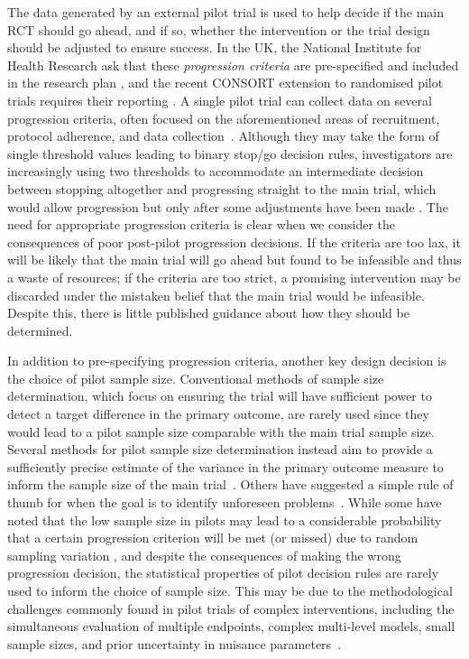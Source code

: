 \documentclass[AMA,STIX1COL]{WileyNJD-v2}
\begin{document}
The data generated by an external pilot trial is used to help decide if the main RCT should go ahead, and if so, whether the intervention or the trial design should be adjusted to ensure success. In the UK, the National Institute for Health Research ask that these \emph{progression criteria} are pre-specified and included in the research plan \cite{NIHR2017}, and the recent CONSORT extension to randomised pilot trials requires their reporting \cite{Eldridge2016a}. A single pilot trial can collect data on several progression criteria, often focused on the aforementioned areas of recruitment, protocol adherence, and data collection~\cite{Avery2017}. Although they may take the form of single threshold values leading to binary stop/go decision rules, investigators are increasingly using two thresholds to accommodate an intermediate decision between stopping altogether and progressing straight to the main trial, which would allow progression but only after some adjustments have been made \cite{Eldridge2016a}. The need for appropriate progression criteria is clear when we consider the consequences of poor post-pilot progression decisions. If the criteria are too lax, it will be likely that the main trial will go ahead but found to be infeasible and thus a waste of resources; if the criteria are too strict, a promising intervention may be discarded under the mistaken belief that the main trial would be infeasible. Despite this, there is little published guidance about how they should be determined\cite{Avery2017, Hampson2017}.

In addition to pre-specifying progression criteria, another key design decision is the choice of pilot sample size. Conventional methods of sample size determination, which focus on ensuring the trial will have sufficient power to detect a target difference in the primary outcome, are rarely used since they would lead to a pilot sample size comparable with the main trial sample size. Several methods for pilot sample size determination instead aim to provide a sufficiently precise estimate of the variance in the primary outcome measure to inform the sample size of the main trial~\cite{Browne1995, Julious2005, Sim2012, Teare2014, Eldridge2015, Whitehead2015}. Others have suggested a simple rule of thumb for when the goal is to identify unforeseen problems~\cite{Viechtbauer2015}. While some have noted that the low sample size in pilots may lead to a considerable probability that a certain progression criterion will be met (or missed) due to random sampling variation \cite{Eldridge2015, Cooper2018}, and despite the consequences of making the wrong progression decision, the statistical properties of pilot decision rules are rarely used to inform the choice of sample size. This may be due to the methodological challenges commonly found in  pilot trials of complex interventions, including the simultaneous evaluation of multiple endpoints, complex multi-level models, small sample sizes, and prior uncertainty in nuisance parameters~\cite{Wilson2015}.
\end{document}

